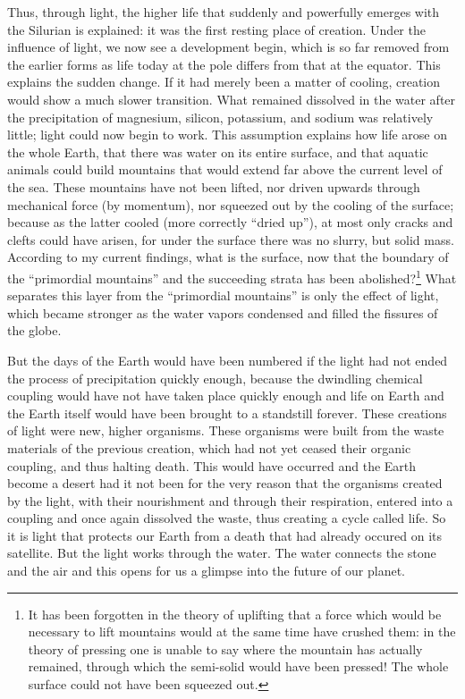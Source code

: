\documentclass[a4paper, 12pt, oneside]{article}
\begin{document}
Thus, through light, the higher life that suddenly and powerfully emerges with the Silurian is explained: it was the first resting place of creation. Under the influence of light, we now see a development begin, which is so far removed from the earlier forms as life today at the pole differs from that at the equator. This explains the sudden change. If it had merely been a matter of cooling, creation would show a much slower transition. What remained dissolved in the water after the precipitation of magnesium, silicon, potassium, and sodium was relatively little; light could now begin to work. This assumption explains how life arose on the whole Earth, that there was water on its entire surface, and that aquatic animals could build mountains that would extend far above the current level of the sea. These mountains have not been lifted, nor driven upwards through mechanical force (by momentum), nor squeezed out by the cooling of the surface; because as the latter cooled (more correctly ``dried up''), at most only cracks and clefts could have arisen, for under the surface there was no slurry, but solid mass. According to my current findings, what is the surface, now that the boundary of the ``primordial mountains'' and the succeeding strata has been abolished?\footnote{It has been forgotten in the theory of uplifting that a force which would be necessary to lift mountains would at the same time have crushed them: in the theory of pressing one is unable to say where the mountain has actually remained, through which the semi-solid would have been pressed! The whole surface could not have been squeezed out.} What separates this layer from the ``primordial mountains'' is only the effect of light, which became stronger as the water vapors condensed and filled the fissures of the globe.

But the days of the Earth would have been numbered if the light had not ended the process of precipitation quickly enough, because the dwindling chemical coupling would have not have taken place quickly enough and life on Earth and the Earth itself would have been brought to a standstill forever. These creations of light were new, higher organisms. These organisms were built from the waste materials of the previous creation, which had not yet ceased their organic coupling, and thus halting death. This would have occurred and the Earth become a desert had it not been for the very reason that the organisms created by the light, with their nourishment and through their respiration, entered into a coupling and once again dissolved the waste, thus creating a cycle called life. So it is light that protects our Earth from a death that had already occured on its satellite. But the light works through the water. The water connects the stone and the air and this opens for us a glimpse into the future of our planet.
\clearpage
\end{document}
